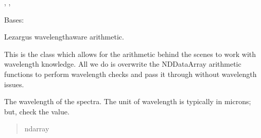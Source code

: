 \documentclass[letterpaper,11pt,english]{sphinxmanual}
\begin{document}
\begin{savenotes}
\begin{fulllineitems}
{{{\begin{footnote}[37]\sphinxAtStartFootnote
{}
%
\end{footnote}}}, , }{}
\pysigstopsignatures
\sphinxAtStartPar
Bases: 

\sphinxAtStartPar
Lezargus wavelength\sphinxhyphen{}aware arithmetic.

\sphinxAtStartPar
This is the class which allows for the arithmetic behind the scenes to
work with wavelength knowledge. All we do is overwrite the NDDataArray
arithmetic functions to perform wavelength checks and pass it through
without wavelength issues.

\begin{savenotes}\begin{fulllineitems}
\label{\detokenize{code/lezargus.container.parent:lezargus.container.parent.LezargusContainerArithmetic.wavelength}}
\pysigstartsignatures
{}
\pysigstopsignatures
\sphinxAtStartPar
The wavelength of the spectra. The unit of wavelength is typically
in microns; but, check the  value.
\begin{quote}\begin{description}
\sphinxAtStartPar
ndarray

\end{description}\end{quote}

\end{fulllineitems}\end{savenotes}



\end{fulllineitems}
\end{savenotes}
\end{document}
